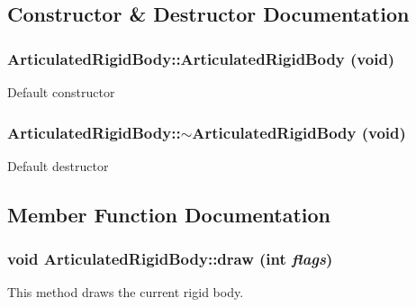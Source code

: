 \subsection{Constructor \& Destructor Documentation}
\hypertarget{classCartWheel_1_1Physics_1_1ArticulatedRigidBody_a8543b6cd0116d87bba59bc9d14c0ccdf}{
\subsubsection[{ArticulatedRigidBody}]{\setlength{\rightskip}{0pt plus 5cm}ArticulatedRigidBody::ArticulatedRigidBody (void)}}
\label{classCartWheel_1_1Physics_1_1ArticulatedRigidBody_a8543b6cd0116d87bba59bc9d14c0ccdf}
Default constructor \hypertarget{classCartWheel_1_1Physics_1_1ArticulatedRigidBody_a128983c23bdffa4711405b547c8af18d}{
\subsubsection[{$\sim$ArticulatedRigidBody}]{\setlength{\rightskip}{0pt plus 5cm}ArticulatedRigidBody::$\sim$ArticulatedRigidBody (void)}}
\label{classCartWheel_1_1Physics_1_1ArticulatedRigidBody_a128983c23bdffa4711405b547c8af18d}
Default destructor 

\subsection{Member Function Documentation}
\hypertarget{classCartWheel_1_1Physics_1_1ArticulatedRigidBody_a59e3001f695f399dec34833dbb5871f0}{
\subsubsection[{draw}]{\setlength{\rightskip}{0pt plus 5cm}void ArticulatedRigidBody::draw (int {\em flags})}}
\label{classCartWheel_1_1Physics_1_1ArticulatedRigidBody_a59e3001f695f399dec34833dbb5871f0}
This method draws the current rigid body. 

